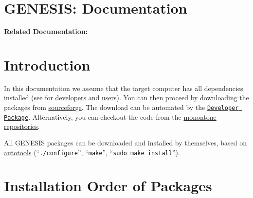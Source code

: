 \documentclass[12pt]{article}
\begin{document}
\section*{GENESIS: Documentation}

{\bf Related Documentation:}

\section*{Introduction}

In this documentation we assume that the target computer has all
dependencies installed (see for
\href{../installation-developer/installation-developer.tex}{developers}
and \href{../installation-user/installation-user.tex}{users}). You can
then proceed by downloading the packages from
\href{http://sourceforge.net/project/showfiles.php?group_id=162899}{sourceforge}.
The download can be automated by the
\href{../developer-package/developer-package.tex}{\tt Developer
  Package}. Alternatively, you can checkout the code from the
\href{http://monotone.ca/}{monontone}
\href{../developer-intro/developer-intro.tex}{repositories}.

All GENESIS packages can be downloaded and installed by themselves,
based on \href{http://www.gnu.org/software/autoconf/}{autotools}
(``{\tt ./configure}'', ``{\tt make}'', ``{\tt sudo make install}'').



\section*{Installation Order of Packages}
\end{document}
